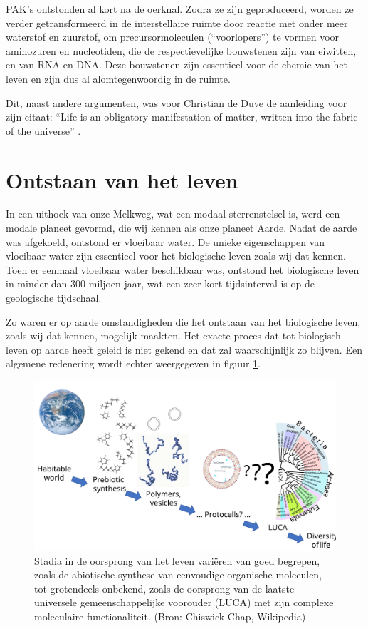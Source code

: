 \documentclass[
  11pt,
]{book}
\begin{document}
PAK's ontstonden al kort na de oerknal. Zodra ze zijn geproduceerd, worden ze verder getransformeerd in de interstellaire ruimte door reactie met onder meer waterstof en zuurstof, om precursormoleculen (``voorlopers'') te vormen voor aminozuren en nucleotiden, die de respectievelijke bouwstenen zijn van eiwitten, en van RNA en DNA. Deze bouwstenen zijn essentieel voor de chemie van het leven en zijn dus al alomtegenwoordig in de ruimte.

Dit, naast andere argumenten, was voor Christian de Duve de aanleiding voor zijn citaat: ``Life is an obligatory manifestation of matter, written into the fabric of the universe'' \citep{deDuve2002}.

\hypertarget{ontstaan-van-het-leven}{%
\section{Ontstaan van het leven}\label{ontstaan-van-het-leven}}

In een uithoek van onze Melkweg, wat een modaal sterrenstelsel is, werd een modale planeet gevormd, die wij kennen als onze planeet Aarde. Nadat de aarde was afgekoeld, ontstond er vloeibaar water. De unieke eigenschappen van vloeibaar water zijn essentieel voor het biologische leven zoals wij dat kennen. Toen er eenmaal vloeibaar water beschikbaar was, ontstond het biologische leven in minder dan 300 miljoen jaar, wat een zeer kort tijdsinterval is op de geologische tijdschaal.

Zo waren er op aarde omstandigheden die het ontstaan van het biologische leven, zoals wij dat kennen, mogelijk maakten. Het exacte proces dat tot biologisch leven op aarde heeft geleid is niet gekend en dat zal waarschijnlijk zo blijven. Een algemene redenering wordt echter weergegeven in figuur \ref{fig:originOfLife}.

\begin{figure}

{\centering \includegraphics[width=1\linewidth]{./figs/origin_of_life_stages} 

}

\caption{Stadia in de oorsprong van het leven variëren van goed begrepen, zoals de abiotische synthese van eenvoudige organische moleculen, tot grotendeels onbekend, zoals de oorsprong van de laatste universele gemeenschappelijke voorouder (LUCA) met zijn complexe moleculaire functionaliteit. (Bron: Chiswick Chap, Wikipedia)}\label{fig:originOfLife}
\end{figure}
\end{document}
